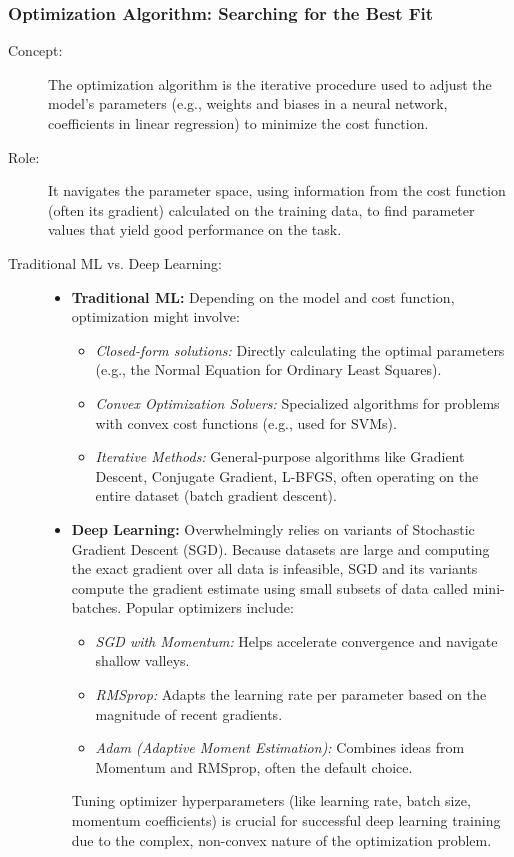 \documentclass{article}
\begin{document}
\subsubsection{Optimization Algorithm: Searching for the Best Fit}
\begin{description}
    \item[Concept:] The optimization algorithm is the iterative procedure used to adjust the model's parameters (e.g., weights and biases in a neural network, coefficients in linear regression) to minimize the cost function.

    \item[Role:] It navigates the parameter space, using information from the cost function (often its gradient) calculated on the training data, to find parameter values that yield good performance on the task.

    \item[Traditional ML vs. Deep Learning:]
        \begin{itemize}
            \item \textbf{Traditional ML:} Depending on the model and cost function, optimization might involve:
                \begin{itemize}
                    \item \textit{Closed-form solutions:} Directly calculating the optimal parameters (e.g., the Normal Equation for Ordinary Least Squares).
                    \item \textit{Convex Optimization Solvers:} Specialized algorithms for problems with convex cost functions (e.g., used for SVMs).
                    \item \textit{Iterative Methods:} General-purpose algorithms like Gradient Descent, Conjugate Gradient, L-BFGS, often operating on the entire dataset (batch gradient descent).
                \end{itemize}
            \item \textbf{Deep Learning:} Overwhelmingly relies on variants of Stochastic Gradient Descent (SGD). Because datasets are large and computing the exact gradient over all data is infeasible, SGD and its variants compute the gradient estimate using small subsets of data called mini-batches. Popular optimizers include:
                \begin{itemize}
                    \item \textit{SGD with Momentum:} Helps accelerate convergence and navigate shallow valleys.
                    \item \textit{RMSprop:} Adapts the learning rate per parameter based on the magnitude of recent gradients.
                    \item \textit{Adam (Adaptive Moment Estimation):} Combines ideas from Momentum and RMSprop, often the default choice.
                \end{itemize}
            Tuning optimizer hyperparameters (like learning rate, batch size, momentum coefficients) is crucial for successful deep learning training due to the complex, non-convex nature of the optimization problem.
        \end{itemize}
\end{description}
\end{document}
